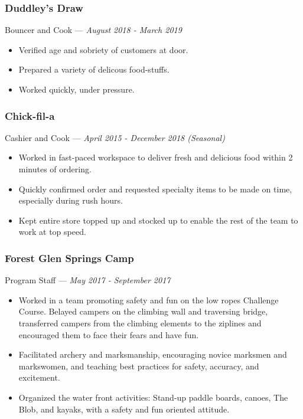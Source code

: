 \documentclass[letterpaper,10pt]{article}
\begin{document}
    \subsubsection{Duddley's Draw}
    \hfill Bouncer and Cook --- \emph{August 2018 - March 2019}

    \begin{itemize}
        \tightlist{}
        \item 
        Verified age and sobriety of customers at door.
        \item
        Prepared a variety of delicous food-stuffs.
        \item
        Worked quickly, under pressure.
    \end{itemize}


    \subsubsection{Chick-fil-a}
    \hfill Cashier and Cook --- \emph{April 2015 - December 2018 (Seasonal)}

    \begin{itemize}
        \tightlist{}
        \item
        Worked in fast-paced workspace to deliver fresh and delicious food within 2 minutes of ordering.
        \item
        Quickly confirmed order and requested specialty items to be made on time, especially during rush hours.
        \item
        Kept entire store topped up and stocked up to enable the rest of the team to work at top speed.
    \end{itemize}

    \subsubsection{Forest Glen Springs Camp}
    \hfill Program Staff --- \emph{May 2017 - September 2017}

    \begin{itemize}
        \tightlist{}
        \item
        Worked in a team promoting safety and fun on the low ropes Challenge Course.
        Belayed campers on the climbing wall and traversing bridge, transferred campers from the climbing elements to the ziplines and encouraged them to face their fears and have fun.
        \item
        Facilitated archery and marksmanship, encouraging novice marksmen and markswomen, and teaching best practices for safety, accuracy, and excitement.
        \item
        Organized the water front activities: Stand-up paddle boards, canoes, The Blob, and kayaks, with a safety and fun oriented attitude.
    \end{itemize}
\end{document}

